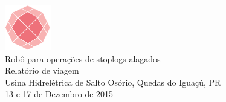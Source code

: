 \vfill%
\begin{center}
  {\GRANDE \raisebox{1.4ex}{} \includegraphics[width=20mm]{logo/logoRosa.png}}
  \\[10mm] {\Grande Robô para operações de stoplogs alagados} \\[25mm]
  {\Grande Relatório de viagem} \\[20mm]
  {\large Usina Hidrelétrica de Salto Osório, Quedas do Iguaçú, PR} \\[5mm]
  {\large 13 e 17 de Dezembro de 2015}
  \vfill%
\end{center}

\newpage%
\pagestyle{fancy}%
\thispagestyle{fancy}%
\renewcommand{\headrulewidth}  {0.4pt}%
\renewcommand{\footrulewidth}  {0.4pt}%
%
%
\rhead{\sf\thepage}%
%
\cfoot{}%
\rfoot{\sf [\hours] \quad \today}%
